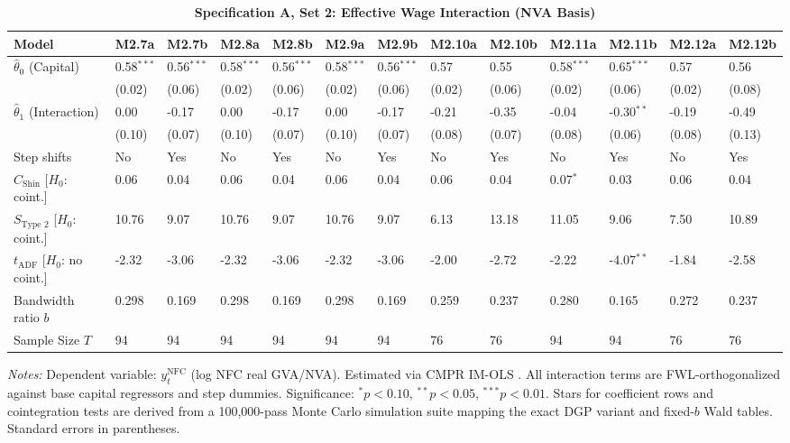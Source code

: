\FloatBarrier
\begin{table}[h!]
\centering
\caption{\textbf{Specification A, Set 2: Effective Wage Interaction (NVA Basis)}}
\label{tab:specA_set2_nva_app}
\tiny
\setlength{\tabcolsep}{1.5pt}
\begin{tabular}{p{3.2cm}p{1.0cm}p{1.0cm}p{1.0cm}p{1.0cm}p{1.0cm}p{1.0cm}p{1.0cm}p{1.0cm}p{1.0cm}p{1.0cm}p{1.0cm}p{1.0cm}}
\toprule
Model & M2.7a & M2.7b & M2.8a & M2.8b & M2.9a & M2.9b & M2.10a & M2.10b & M2.11a & M2.11b & M2.12a & M2.12b \\
\midrule
$\hat{\theta}_0$ (Capital) & 0.58$^{***}$ & 0.56$^{***}$ & 0.58$^{***}$ & 0.56$^{***}$ & 0.58$^{***}$ & 0.56$^{***}$ & 0.57 & 0.55 & 0.58$^{***}$ & 0.65$^{***}$ & 0.57 & 0.56 \\
 & (0.02) & (0.06) & (0.02) & (0.06) & (0.02) & (0.06) & (0.02) & (0.06) & (0.02) & (0.06) & (0.02) & (0.08) \\
$\hat{\theta}_1$ (Interaction) & 0.00 & -0.17 & 0.00 & -0.17 & 0.00 & -0.17 & -0.21 & -0.35 & -0.04 & -0.30$^{**}$ & -0.19 & -0.49 \\
 & (0.10) & (0.07) & (0.10) & (0.07) & (0.10) & (0.07) & (0.08) & (0.07) & (0.08) & (0.06) & (0.08) & (0.13) \\
\midrule
Step shifts & No & Yes & No & Yes & No & Yes & No & Yes & No & Yes & No & Yes \\
$C_{\text{Shin}}$ [$H_0$: coint.] & 0.06 & 0.04 & 0.06 & 0.04 & 0.06 & 0.04 & 0.06 & 0.04 & 0.07$^{*}$ & 0.03 & 0.06 & 0.04 \\
$S_{\text{Type 2}}$ [$H_0$: coint.] & 10.76 & 9.07 & 10.76 & 9.07 & 10.76 & 9.07 & 6.13 & 13.18 & 11.05 & 9.06 & 7.50 & 10.89 \\
$t_{\text{ADF}}$ [$H_0$: no coint.] & -2.32 & -3.06 & -2.32 & -3.06 & -2.32 & -3.06 & -2.00 & -2.72 & -2.22 & -4.07$^{**}$ & -1.84 & -2.58 \\
Bandwidth ratio $b$ & 0.298 & 0.169 & 0.298 & 0.169 & 0.298 & 0.169 & 0.259 & 0.237 & 0.280 & 0.165 & 0.272 & 0.237 \\
Sample Size $T$ & 94 & 94 & 94 & 94 & 94 & 94 & 76 & 76 & 94 & 94 & 76 & 76 \\
\bottomrule
\end{tabular}
\begin{minipage}{\textwidth}
\scriptsize
\textit{Notes:} Dependent variable: $y_t^{\text{NFC}}$ (log NFC real GVA/NVA). Estimated via CMPR IM-OLS \citep{VogelsangWagner2014}. All interaction terms are FWL-orthogonalized against base capital regressors and step dummies. Significance: $^*p<0.10$, $^{**}p<0.05$, $^{***}p<0.01$. Stars for coefficient rows and cointegration tests are derived from a 100,000-pass Monte Carlo simulation suite mapping the exact DGP variant and fixed-$b$ Wald tables. Standard errors in parentheses.
\end{minipage}
\end{table}

